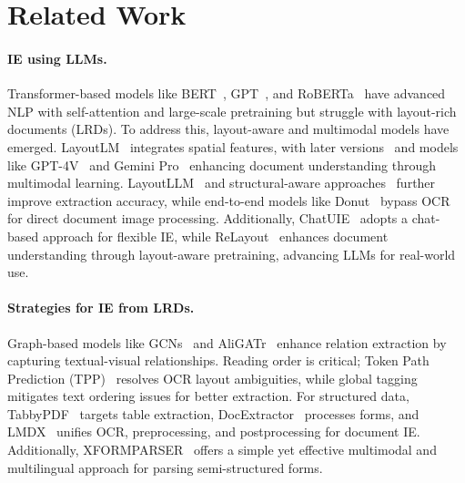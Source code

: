 \section{Related Work}
\label{sec:related_work}

\paragraph{IE using LLMs.} Transformer-based models like BERT~\cite{devlin2019bert}, GPT~\cite{brown2020language}, and RoBERTa~\cite{liu2019roberta} have advanced NLP with self-attention and large-scale pretraining but struggle with layout-rich documents (LRDs). To address this, layout-aware and multimodal models have emerged. LayoutLM~\cite{xu2020layoutlm} integrates spatial features, with later versions~\cite{xu2021layoutlmv2, xu2022layoutlmv3} and models like GPT-4V~\cite{openai2023gpt4} and Gemini Pro~\cite{anil2023gemini} enhancing document understanding through multimodal learning. LayoutLLM~\cite{fujitake-2024-layoutllm} and structural-aware approaches~\cite{lee2022formnetstructuralencodingsequential} further improve extraction accuracy, while end-to-end models like Donut~\cite{kim2022ocr} bypass OCR for direct document image processing. Additionally, ChatUIE~\cite{xu-etal-2024-chatuie} adopts a chat-based approach for flexible IE, while ReLayout~\cite{jiang-etal-2025-relayout} enhances document understanding through layout-aware pretraining, advancing LLMs for real-world use.

\paragraph{Strategies for IE from LRDs.} Graph-based models like GCNs~\cite{liu-etal-2019-graph} and AliGATr~\cite{nourbakhsh-etal-2024-aligatr} enhance relation extraction by capturing textual-visual relationships. Reading order is critical; Token Path Prediction (TPP)~\cite{zhang-etal-2023-reading} resolves OCR layout ambiguities, while global tagging~\cite{shaojie-etal-2023-document} mitigates text ordering issues for better extraction. For structured data, TabbyPDF~\cite{jain2020tabbypdf} targets table extraction, DocExtractor~\cite{zhong2020docextractor} processes forms, and LMDX~\cite{perot-etal-2024-lmdx} unifies OCR, preprocessing, and postprocessing for document IE. Additionally, XFORMPARSER~\cite{cheng-etal-2025-xformparser} offers a simple yet effective multimodal and multilingual approach for parsing semi-structured forms.

